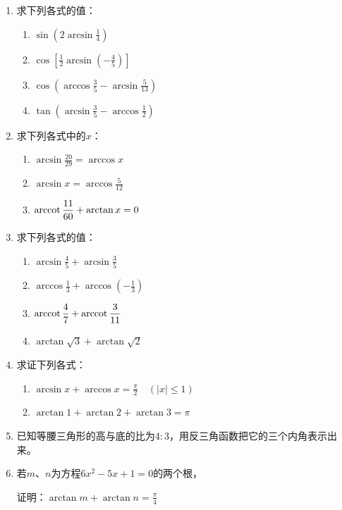 \begin{enumerate}
\item 求下列各式的值：
\begin{multicols}{2}
\begin{enumerate}[(1)]
    \item $\sin\left(2\arcsin \frac{1}{4}\right)$
    \item $\cos\left[\frac{1}{2}\arcsin \left(-\frac{4}{5}\right)\right]$
    \item $\cos\left(\arccos\frac{3}{5}-\arcsin\frac{5}{13} \right)$
    \item $\tan\left(\arcsin \frac{3}{5}-\arccos\frac{1}{2}\right)$
\end{enumerate}
\end{multicols}

\item 求下列各式中的$x$：
\begin{multicols}{2}
\begin{enumerate}[(1)]
    \item $\arcsin\frac{20}{29}=\arccos x$
    \item $\arcsin x=\arccos\frac{5}{12}$
    \item ${\rm arccot\,}\dfrac{11}{60}+\arctan x=0$
\end{enumerate}
\end{multicols}

\item 求下列各式的值：
\begin{multicols}{2}
\begin{enumerate}[(1)]
\item $\arcsin\frac{4}{5}+\arcsin\frac{3}{5}$
\item $\arccos\frac{1}{3}+\arccos\left(-\frac{1}{3}\right)$
\item ${\rm arccot\,}\dfrac{4}{7}+{\rm arccot\,} \dfrac{3}{11}$
\item $\arctan\sqrt{3}+\arctan\sqrt{2}$
\end{enumerate}
\end{multicols}

\item 求证下列各式：
\begin{enumerate}[(1)]
    \item $\arcsin x+\arccos x=\frac{\pi}{2}\quad (|x|\le 1)$
    \item $\arctan 1+\arctan 2+\arctan 3=\pi$
\end{enumerate}

\item 已知等腰三角形的高与底的比为$4:3$，用反三角函数把它的三个内角表示出来。
\item 若$m$、$n$为方程$6x^2-5x+1=0$的两个根，

证明：$\arctan m+\arctan n=\frac{\pi}{4}$
\end{enumerate}


